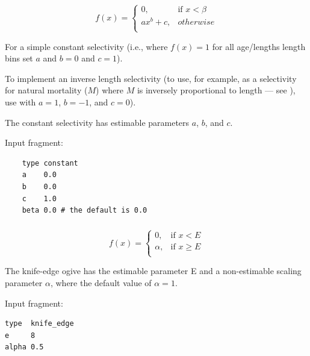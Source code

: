 \begin{equation}
	f(x)= \begin{cases}
		0, & \text{if $x < \beta$} \\
		ax^b + c, & otherwise \\
	\end{cases}
\end{equation}

For a simple constant selectivity (i.e., where $f(x) = 1$ for all \ifAgeBased age/lengths \else length bins \fi set $a$ and $b = 0$ and $c = 1$). 

To implement an inverse length selectivity (to use, for example, as a selectivity for natural mortality ($M$) where $M$ is inversely proportional to length --- see \cite{lorenzen_natural_2022}), use \ifAgeBased {} with \fi $a=1$, $b=-1$, and $c=0$).

The constant selectivity has estimable parameters $a$, $b$, and $c$.

Input fragment: 
{\small{\begin{verbatim}
	type constant
	a    0.0
	b    0.0
	c    1.0
	beta 0.0 # the default is 0.0
\end{verbatim}}}

\subsubsection[Knife edge]{} \label{sec:Selectivity-KnifeEdge} 

\begin{equation}
	f(x)= \begin{cases}
	  0, & \text{if $x < E$} \\
	  \alpha, & \text{if $x \ge E$}\\
	  \end{cases}
\end{equation}

The knife-edge ogive has the estimable parameter E and a non-estimable scaling parameter $\alpha$, where the default value of $\alpha = 1$.

Input fragment: {\small{\begin{verbatim}
type  knife_edge
e     8
alpha 0.5
\end{verbatim}}}

\subsubsection[All values]{}  \label{sec:Selectivity-AllValues}

